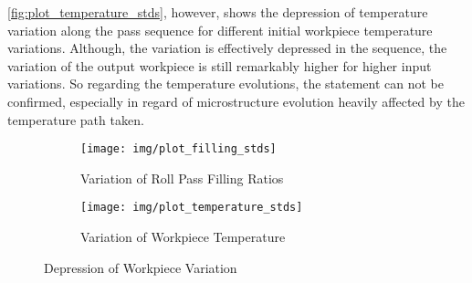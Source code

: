 \autoref{fig:plot_temperature_stds}, however, shows the depression of temperature variation along the pass sequence for different initial workpiece temperature variations.
Although, the variation is effectively depressed in the sequence, the variation of the output workpiece is still remarkably higher for higher input variations.
So regarding the temperature evolutions, the statement can not be confirmed, especially in regard of microstructure evolution heavily affected by the temperature path taken.

\begin{figure}
    \begin{subfigure}{\linewidth}
        \centering
        \texttt{[image: img/plot\_filling\_stds]}
        \caption{Variation of Roll Pass Filling Ratios}
        \label{fig:plot_filling_stds}
    \end{subfigure}
    \begin{subfigure}{\linewidth}
        \centering
        \texttt{[image: img/plot\_temperature\_stds]}
        \caption{Variation of Workpiece Temperature}
        \label{fig:plot_temperature_stds}
    \end{subfigure}
    \caption{Depression of Workpiece Variation}
\end{figure}